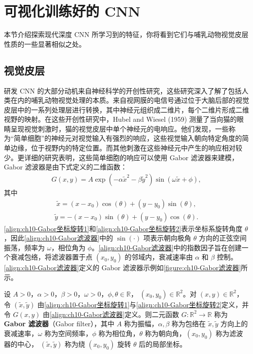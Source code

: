\documentclass[../../main.tex]{subfiles}
\begin{document}
\section{可视化训练好的 CNN}\label{section:ch10-可视化训练好的CNN}

本节介绍探索现代深度 CNN 所学习到的特征，你将看到它们与哺乳动物视觉皮层性质的一些显著相似之处。

\subsection{视觉皮层}\label{subsection:ch10-视觉皮层}

研发 CNN 的大部分动机来自神经科学的开创性研究，这些研究深入了解了包括人类在内的哺乳动物视觉处理的本质。来自视网膜的电信号通过位于大脑后部的视觉皮层中的一系列处理层进行转换，其中神经元组织成二维片，每个二维片形成二维视野的映射。在这些开创性研究中，Hubel and Wiesel (1959) 测量了当向猫的眼睛呈现视觉刺激时，猫的视觉皮层中单个神经元的电响应。他们发现，一些称为“简单细胞”的神经元对视觉输入有强烈的响应，这些视觉输入朝向特定角度的简单边缘，位于视野内的特定位置。而其他刺激在这些神经元中产生的响应相对较少。更详细的研究表明，这些简单细胞的响应可以使用 Gabor 滤波器来建模，Gabor 滤波器是由下式定义的二维函数：
\begin{align}
  G(x,y) = A\exp\left(-\alpha\tilde{x}^2-\beta\tilde{y}^2\right)\sin\left(\omega\tilde{x}+\phi\right),
  \label{align:ch10-Gabor滤波器}
\end{align}
其中
\begin{align}
  \tilde{x} = (x-x_0)\cos(\theta)+(y-y_0)\sin(\theta),
  \label{align:ch10-Gabor坐标旋转1}
\end{align}
\begin{align}
  \tilde{y} = -(x-x_0)\sin(\theta)+(y-y_0)\cos(\theta).
  \label{align:ch10-Gabor坐标旋转2}
\end{align}
\eqref{align:ch10-Gabor坐标旋转1}和\eqref{align:ch10-Gabor坐标旋转2}表示坐标系旋转角度 $\theta$，因此\eqref{align:ch10-Gabor滤波器}中的 $\sin(\cdot)$ 项表示朝向极角 $\theta$ 方向的正弦空间振荡，频率为 $\omega$，相位角为 $\phi$。\eqref{align:ch10-Gabor滤波器}中的指数因子旨在创建一个衰减包络，将滤波器置于点 $(x_0,y_0)$ 的邻域内，衰减速率由 $\alpha$ 和 $\beta$ 控制。\eqref{align:ch10-Gabor滤波器}定义的 Gabor 滤波器示例如\cref{figure:ch10-Gabor滤波器}所示。

\begin{definition}\label{definition:ch10-Gabor滤波器}
设 $A>0$，$\alpha>0$，$\beta>0$，$\omega>0$，$\phi,\theta\in\mathbb{R}$，
$(x_0,y_0)\in\mathbb{R}^{2}$。对 $(x,y)\in\mathbb{R}^{2}$，令 $(\tilde{x},\tilde{y})$
由\eqref{align:ch10-Gabor坐标旋转1}与\eqref{align:ch10-Gabor坐标旋转2}定义，并令
$G(x,y)$ 由\eqref{align:ch10-Gabor滤波器}定义。则二元函数
$G:\mathbb{R}^{2}\to\mathbb{R}$ 称为\textbf{Gabor 滤波器}（Gabor filter），其中 $A$
称为振幅，$\alpha,\beta$ 称为包络在 $\tilde{x},\tilde{y}$ 方向上的衰减速率，$\omega$
称为空间频率，$\phi$ 称为相位角，$\theta$ 称为朝向角，$(x_0,y_0)$ 称为滤波器的中心，
$(\tilde{x},\tilde{y})$ 称为绕 $(x_0,y_0)$ 旋转 $\theta$ 后的局部坐标。
\end{definition}
\end{document}
